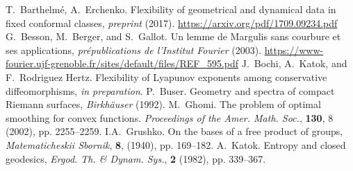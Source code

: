 \documentclass[12pt]{article}
\numberwithin{equation}{section}
\theoremstyle{definition}
\begin{document}
{\small
\begin{thebibliography}{1}

 T.~Barthelm\'e, A.~Erchenko. Flexibility of geometrical and dynamical data in fixed conformal classes, \textit{preprint} (2017). \href{https://arxiv.org/pdf/1709.09234.pdf}{https://arxiv.org/pdf/1709.09234.pdf}
 G.~Besson, M.~Berger, and S.~Gallot. Un lemme de Margulis sans courbure et ses applications, \emph{pr\'epublications de l'Institut Fourier} (2003). \href{https://www-fourier.ujf-grenoble.fr/?q=fr/content/595-un-lemme-de-margulis-sans-courbure-et-ses-applications}{https://www-fourier.ujf-grenoble.fr/sites/default/files/REF\_595.pdf}
 J.~Bochi, A.~Katok, and F.~Rodriguez Hertz. Flexibility of Lyapunov exponents among conservative diffeomorphisms, \textit{in preparation}.
 P.~Buser. Geometry and spectra of compact Riemann surfaces, \textit{Birkh\"auser} (1992).
 M.~Ghomi. The problem of optimal smoothing for convex functions. \textit{Proceedings of the Amer. Math. Soc.}, \textbf{130}, 8 (2002), pp. 2255--2259.
 I.A.~Grushko. On the bases of a free product of groups, \textit{Matematicheskii Sbornik},  \textbf{8}, (1940), pp. 169--182.
 A.~Katok. Entropy and closed geodesics, \textit{Ergod. Th. \& Dynam. Sys.}, \textbf{2} (1982), pp. 339--367.

\end{thebibliography}}
\end{document}

